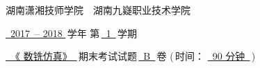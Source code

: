 \documentclass[12pt,twocolumn,landscape,UTF8,twoside]{ctexart}
\author{高星}
\begin{document}
\noindent	
	
\begin{spacing}{1.5}
		\begin{center}
			 \heiti 
				湖南潇湘技师学院~~湖南九嶷职业技术学院
				
				\underline{~2017~-- 2018 }\,学年 \hspace{1cm} 第\,\underline{~1~}\,学期
				
				\underline{~《 数铣仿真》~}\,期末考试试题\,\underline{~B~}\,卷 (\,时间： \underline{~90 分钟~}\,)
\end{center}
\end{spacing}
\end{document}
